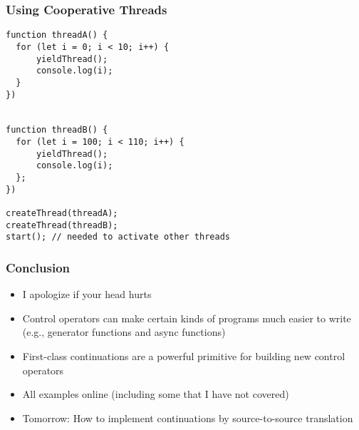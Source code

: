 \documentclass[8pt,pdf]{beamer}
\begin{document}
\begin{frame}[fragile]
\frametitle{Using Cooperative Threads}

\begin{lstlisting}
function threadA() {
  for (let i = 0; i < 10; i++) {
      yieldThread();
      console.log(i);
  }
})


function threadB() {
  for (let i = 100; i < 110; i++) {
      yieldThread();
      console.log(i);
  };
})

createThread(threadA);
createThread(threadB);
start(); // needed to activate other threads
\end{lstlisting}
\end{frame}

\begin{frame}
\frametitle{Conclusion}

\begin{itemize}

  \item I apologize if your head hurts


  \item Control operators can make certain kinds of programs much easier to
  write (e.g., generator functions and async functions)

  \item First-class continuations are a powerful primitive for building new
  control operators

  \item All examples online (including some that I have not covered)

  \item Tomorrow: How to implement continuations by source-to-source translation


\end{itemize}

\end{frame}
\end{document}
